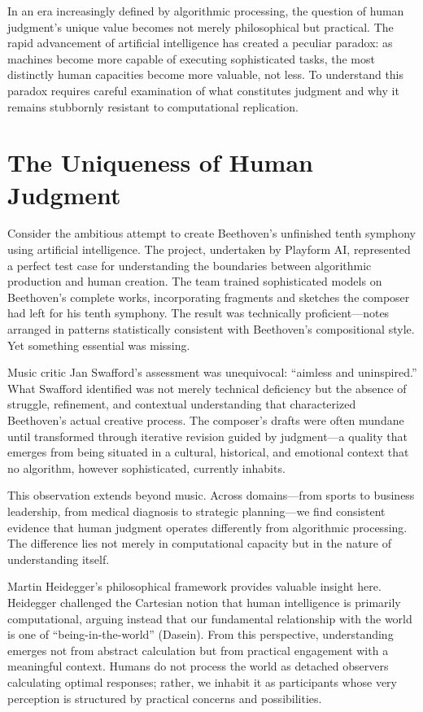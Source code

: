 \documentclass[
  Letterpaper,
]{scrbook}
\begin{document}
\hfill\break

In an era increasingly defined by algorithmic processing, the question
of human judgment's unique value becomes not merely philosophical but
practical. The rapid advancement of artificial intelligence has created
a peculiar paradox: as machines become more capable of executing
sophisticated tasks, the most distinctly human capacities become more
valuable, not less. To understand this paradox requires careful
examination of what constitutes judgment and why it remains stubbornly
resistant to computational replication.

\section{The Uniqueness of Human
Judgment}\label{the-uniqueness-of-human-judgment}

Consider the ambitious attempt to create Beethoven's unfinished tenth
symphony using artificial intelligence. The project, undertaken by
Playform AI, represented a perfect test case for understanding the
boundaries between algorithmic production and human creation. The team
trained sophisticated models on Beethoven's complete works,
incorporating fragments and sketches the composer had left for his tenth
symphony. The result was technically proficient---notes arranged in
patterns statistically consistent with Beethoven's compositional style.
Yet something essential was missing.

Music critic Jan Swafford's assessment was unequivocal: ``aimless and
uninspired.'' What Swafford identified was not merely technical
deficiency but the absence of struggle, refinement, and contextual
understanding that characterized Beethoven's actual creative process.
The composer's drafts were often mundane until transformed through
iterative revision guided by judgment---a quality that emerges from
being situated in a cultural, historical, and emotional context that no
algorithm, however sophisticated, currently inhabits.

This observation extends beyond music. Across domains---from sports to
business leadership, from medical diagnosis to strategic planning---we
find consistent evidence that human judgment operates differently from
algorithmic processing. The difference lies not merely in computational
capacity but in the nature of understanding itself.

Martin Heidegger's philosophical framework provides valuable insight
here. Heidegger challenged the Cartesian notion that human intelligence
is primarily computational, arguing instead that our fundamental
relationship with the world is one of ``being-in-the-world'' (Dasein).
From this perspective, understanding emerges not from abstract
calculation but from practical engagement with a meaningful context.
Humans do not process the world as detached observers calculating
optimal responses; rather, we inhabit it as participants whose very
perception is structured by practical concerns and possibilities.
\end{document}
